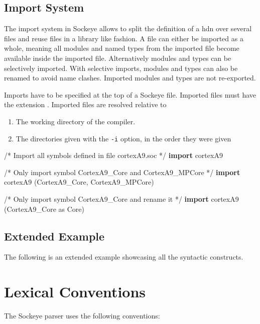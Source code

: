 \documentclass[a4paper,11pt,twoside]{report}
\begin{document}
{{{\section{Import System}
\label{sec:imports}
The import system in Sockeye allows to split the definition of a \gls{hdn} over several files and reuse files in a library like fashion.
A file can either be imported as a whole, meaning all modules and named types from the imported file become available inside the imported file.
Alternatively modules and types can be selectively imported.
With selective imports, modules and types can also be renamed to avoid name clashes.
Imported modules and types are not re-exported.

Imports have to be specified at the top of a Sockeye file.
Imported files must have the extension .
Imported files are resolved relative to
\begin{enumerate}
  \item The working directory of the compiler.
  \item The directories given with the \verb|-i| option, in the order they were given
\end{enumerate}

\begin{example}
/* Import all symbols defined in file cortexA9.soc */
\textbf{import} cortexA9

/* Only import symbol CortexA9_Core and CortexA9_MPCore */
\textbf{import} cortexA9 (CortexA9_Core, CortexA9_MPCore)

/* Only import symbol CortexA9_Core and rename it */
\textbf{import} cortexA9 (CortexA9_Core as Core)
\end{example}

\section{Extended Example}
The following is an extended example showcasing all the syntactic constructs.


\chapter{Lexical Conventions}
\label{chap:lexer}

The Sockeye parser uses the following conventions:

}}}
\end{document}
